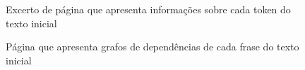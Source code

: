 \documentclass[12pt]{article}
\begin{document}
\begin{figure}[!ht]
	\centering
	\setlength{\abovecaptionskip}{-.4cm}
	\caption{Excerto de página que apresenta informações sobre cada token do texto inicial}
\end{figure}

\begin{figure}[!ht]
	\centering
	\setlength{\abovecaptionskip}{-.4cm}
	\caption{Página que apresenta grafos de dependências de cada frase do texto inicial}
\end{figure}


\clearpage
\end{document}
